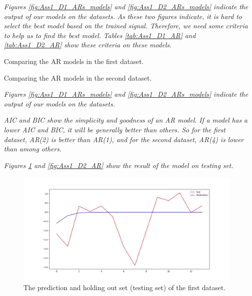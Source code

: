 \textit{Figures \ref{fig:Ass1_D1_ARs_models} and \ref{fig:Ass1_D2_ARs_models} indicate the output of our models on the datasets. As these two figures indicate, it is hard to select the best model based on the trained signal. Therefore, we need some criteria to help us to find the best model. Tables \ref{tab:Ass1_D1_AR} and \ref{tab:Ass1_D2_AR} show these criteria on these models. }

\begin{table}[H]
\centering
\caption{Comparing the \gls{AR} models in the first dataset.}
\label{tab:Ass1_D1_AR}

\end{table}

\begin{table}[H]
\centering
\caption{Comparing the \gls{AR} models in the second dataset.}
\label{tab:Ass1_D2_AR}

\end{table}

\textit{Figures \ref{fig:Ass1_D1_ARs_models} and \ref{fig:Ass1_D2_ARs_models} indicate the output of our models on the datasets.}


\textit{\Gls{AIC} and \gls{BIC} show the simplicity and goodness of an \gls{AR} model. If a model has a lower \Gls{AIC} and \gls{BIC}, it will be generally better than others. So for the first dataset, \gls{AR}(2) is better than \gls{AR}(1), and for the second dataset, \gls{AR}(4) is lower than among others.}

\textit{Figures \ref{fig:Ass1_D1_AR} and \ref{fig:Ass1_D2_AR} show the result of the model on testing set.} 

\begin{figure}[H]
    \centering
    \begin{minipage}[b]{1\textwidth}
        \includegraphics[width=\textwidth]{figures/Ass1/Ass1_D1_AR.png}
    \end{minipage}
    \caption{The prediction and holding out set (testing set) of the first dataset. }
    \label{fig:Ass1_D1_AR}
\end{figure}

